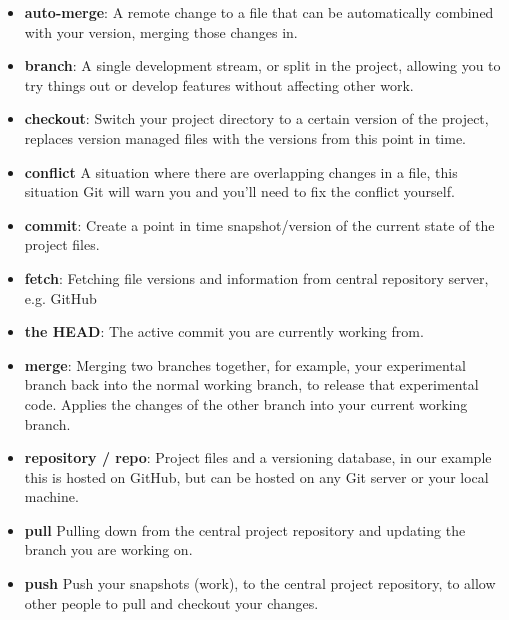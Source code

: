 \begin{itemize}[leftmargin=*]
	\item
	\textbf{auto-merge}:
		A remote change to a file that can be automatically combined with your version, merging those changes in.
	\item
		\textbf{branch}:
		A single development stream, or split in the project, allowing you to try things out or develop features without affecting other work.
	\item
		\textbf{checkout}:
		Switch your project directory to a certain version of the project, replaces version managed files with the versions from this point in time.
	\item
		\textbf{conflict}
		A situation where there are overlapping changes in a file, this situation Git will warn you and you’ll need to fix the conflict yourself.
	\item
		\textbf{commit}:
		Create a point in time snapshot/version of the current state of the project files.
	\item
        \textbf{fetch}:
		Fetching file versions and information from central repository server, e.g. GitHub
	\item
        \textbf{the HEAD}:
		The active commit you are currently working from.
	\item
		\textbf{merge}:
		Merging two branches together, for example, your experimental branch back into the normal working branch, to release that experimental code. Applies the changes of the other branch into your current working branch.
    \item
        \textbf{repository / repo}:
        Project files and a versioning database, in our example this is hosted on GitHub, but can be hosted on any Git server or your local machine.
    \item
    	\textbf{pull}
    	Pulling down from the central project repository and updating the branch you are working on.
    \item
    	\textbf{push}
    	Push your snapshots (work), to the central project repository, to allow other people to pull and checkout your changes.
\end{itemize}